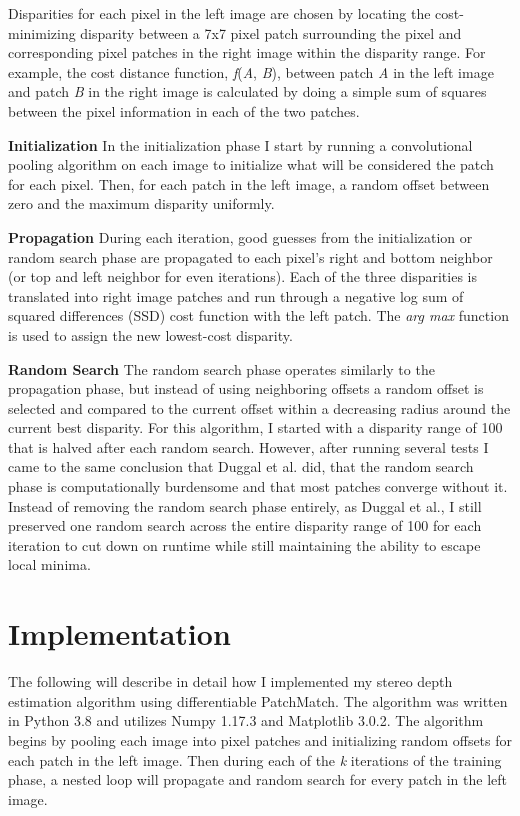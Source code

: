\documentclass{article}
\begin{document}
Disparities for each pixel in the left image are chosen by locating the cost-minimizing disparity between a 7x7 pixel patch surrounding the pixel and corresponding pixel patches in the right image within the disparity range. For example, the cost distance function, \textit{f}(\textit{A}, \textit{B}), between patch \textit{A} in the left image and patch \textit{B} in the right image is calculated by doing a simple sum of squares between the pixel information in each of the two patches.

\textbf{Initialization} In the initialization phase I start by running a convolutional pooling algorithm on each image to initialize what will be considered the patch for each pixel. Then, for each patch in the left image, a random offset between zero and the maximum disparity uniformly.

\textbf{Propagation} During each iteration, good guesses from the initialization or random search phase are propagated to each pixel’s right and bottom neighbor (or top and left neighbor for even iterations). Each of the three disparities is translated into right image patches and run through a negative log sum of squared differences (SSD) cost function with the left patch. The \textit{arg max} function is used to assign the new lowest-cost disparity.

\textbf{Random Search} The random search phase operates similarly to the propagation phase, but instead of using neighboring offsets a random offset is selected and compared to the current offset within a decreasing radius around the current best disparity. For this algorithm, I started with a disparity range of 100 that is halved after each random search. However, after running several tests I came to the same conclusion that Duggal et al. \citep{duggal2019deeppruner} did, that the random search phase is computationally burdensome and that most patches converge without it. Instead of removing the random search phase entirely, as Duggal et al., I still preserved one random search across the entire disparity range of 100 for each iteration to cut down on runtime while still maintaining the ability to escape local minima.

\section{Implementation}
\label{implementation}
The following will describe in detail how I implemented my stereo depth estimation algorithm using differentiable PatchMatch. The algorithm was written in Python 3.8 and utilizes Numpy 1.17.3 and Matplotlib 3.0.2. The algorithm begins by pooling each image into pixel patches and initializing random offsets for each patch in the left image. Then during each of the \textit{k} iterations of the training phase, a nested loop will propagate and random search for every patch in the left image.
\end{document}
